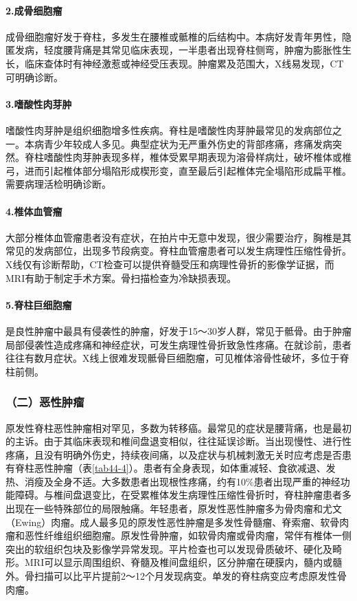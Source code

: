 \paragraph{2.成骨细胞瘤}

成骨细胞瘤好发于脊柱，多发生在腰椎或骶椎的后结构中。本病好发青年男性，隐匿发病，轻度腰背痛是其常见临床表现，一半患者出现脊柱侧弯，肿瘤为膨胀性生长，临床查体时有神经激惹或神经受压表现。肿瘤累及范围大，X线易发现，CT可明确诊断。

\paragraph{3.嗜酸性肉芽肿}

嗜酸性肉芽肿是组织细胞增多性疾病。脊柱是嗜酸性肉芽肿最常见的发病部位之一。本病青少年较成人多见。典型症状为无严重外伤史的背部疼痛，疼痛发病突然。脊柱嗜酸性肉芽肿表现多样，椎体受累早期表现为溶骨样病灶，破坏椎体或椎弓，进而引起椎体部分塌陷形成楔形变，直至最后引起椎体完全塌陷形成扁平椎。需要病理活检明确诊断。

\paragraph{4.椎体血管瘤}

大部分椎体血管瘤患者没有症状，在拍片中无意中发现，很少需要治疗，胸椎是其常见的发病部位，出现多节段病变。脊柱血管瘤患者可以发生病理性压缩性骨折。X线仅有诊断帮助，CT检查可以提供脊髓受压和病理性骨折的影像学证据，而MRI有助于制定手术方案。骨扫描检查为冷缺损表现。

\paragraph{5.脊柱巨细胞瘤}

是良性肿瘤中最具有侵袭性的肿瘤，好发于15～30岁人群，常见于骶骨。由于肿瘤局部侵袭性造成疼痛和神经症状，可发生病理性骨折致急性疼痛。在就诊前，患者往往有数月症状。X线上很难发现骶骨巨细胞瘤，可见椎体溶骨性破坏，多位于脊柱前侧。

\subsubsection{（二）恶性肿瘤}

原发性脊柱恶性肿瘤相对罕见，多数为转移癌。最常见的症状是腰背痛，也是最初的主诉。由于其临床表现和椎间盘退变相似，往往延误诊断。当出现慢性、进行性疼痛，且没有明确外伤史，持续夜间痛，以及症状与机械刺激无关时应考虑是否患有脊柱恶性肿瘤（表\ref{tab44-4}）。患者有全身表现，如体重减轻、食欲减退、发热、消瘦及全身不适。大多数患者出现根性疼痛，约有10\%患者出现严重的神经功能障碍。与椎间盘退变比，在受累椎体发生病理性压缩性骨折时，脊柱肿瘤患者多出现在一些特殊部位的局限触痛。年轻患者，原发性恶性肿瘤多为骨肉瘤和尤文（Ewing）肉瘤。成人最多见的原发性恶性肿瘤是多发性骨髓瘤、脊索瘤、软骨肉瘤和恶性纤维组织细胞瘤。原发性骨肿瘤，如软骨肉瘤或骨肉瘤，常伴有椎体一侧突出的软组织包块及影像学异常发现。平片检查也可以发现骨质破坏、硬化及畸形。MRI可以显示周围组织、脊髓及椎间盘组织，区分肿瘤在硬膜内，髓内或髓外。骨扫描可以比平片提前2～12个月发现病变。单发的脊柱病变应考虑原发性骨肉瘤。

